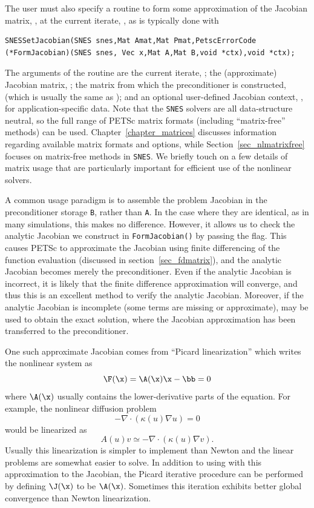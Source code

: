 The user must also specify a routine to form some approximation of the
Jacobian matrix, , at the current iterate, ,
as is typically done with
\begin{lstlisting}
SNESSetJacobian(SNES snes,Mat Amat,Mat Pmat,PetscErrorCode (*FormJacobian)(SNES snes, Vec x,Mat A,Mat B,void *ctx),void *ctx);
\end{lstlisting}
The arguments of the routine  are the current iterate, ; the (approximate) Jacobian matrix,
; the matrix from which the preconditioner is constructed,  (which is usually the same
as );  and an optional user-defined Jacobian
context, , for application-specific data.  
Note that the \lstinline{SNES} solvers are all data-structure neutral, so the full
range of PETSc matrix formats (including ``matrix-free''
methods) can be used.  Chapter~\ref{chapter_matrices} discusses
information regarding available matrix formats and options, while
Section~\ref{sec_nlmatrixfree} focuses on matrix-free
methods in \lstinline{SNES}. We briefly touch on a few details of matrix usage that are
particularly important for efficient use of the nonlinear solvers.

A common usage paradigm is to assemble the problem Jacobian in the
preconditioner storage \lstinline{B}, rather than \lstinline{A}. In the case where they are
identical, as in many simulations, this makes no difference. However, it allows
us to check the analytic Jacobian we construct in \lstinline{FormJacobian()} by
passing the  flag. This causes PETSc to approximate the
Jacobian using finite differencing of the function evaluation (discussed in
section~\ref{sec_fdmatrix}), and the analytic Jacobian becomes merely the
preconditioner. Even if the analytic Jacobian is incorrect, it is likely that
the finite difference approximation will converge, and thus this is an excellent
method to verify the analytic Jacobian. Moreover, if the analytic Jacobian is
incomplete (some terms are missing or approximate),  may
be used to obtain the exact solution, where the Jacobian approximation has been
transferred to the preconditioner.

One such approximate Jacobian comes from ``Picard linearization'' which writes the nonlinear system as
\[ \F(\x) = \A(\x) \x - \bb = 0 \]
where $\A(\x)$ usually contains the lower-derivative parts of the equation.
For example, the nonlinear diffusion problem
\[ - \nabla\cdot(\kappa(u) \nabla u) = 0 \]
would be linearized as
\[ A(u) v \simeq -\nabla\cdot(\kappa(u) \nabla v). \]
Usually this linearization is simpler to implement than Newton and the linear problems are somewhat easier to solve.
In addition to using  with this approximation to the Jacobian, the Picard iterative procedure can be performed by defining
$\J(\x)$ to be $\A(\x)$.
Sometimes this iteration exhibits better global convergence than Newton linearization.

